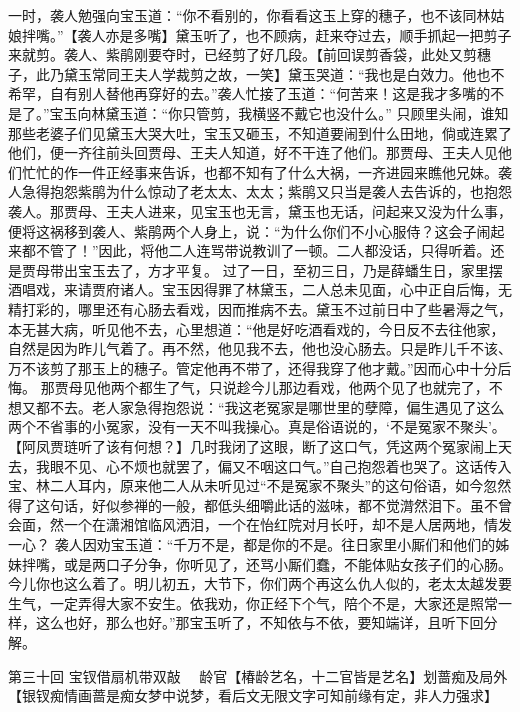 \documentclass[12pt,oneside]{book}
\begin{document}
一时，袭人勉强向宝玉道：“你不看别的，你看看这玉上穿的穗子，也不该同林姑娘拌嘴。”【袭人亦是多嘴】黛玉听了，也不顾病，赶来夺过去，顺手抓起一把剪子来就剪。袭人、紫鹃刚要夺时，已经剪了好几段。【前回误剪香袋，此处又剪穗子，此乃黛玉常同王夫人学裁剪之故，一笑】黛玉哭道：“我也是白效力。他也不希罕，自有别人替他再穿好的去。”袭人忙接了玉道：“何苦来！这是我才多嘴的不是了。”宝玉向林黛玉道：“你只管剪，我横竖不戴它也没什么。”
只顾里头闹，谁知那些老婆子们见黛玉大哭大吐，宝玉又砸玉，不知道要闹到什么田地，倘或连累了他们，便一齐往前头回贾母、王夫人知道，好不干连了他们。那贾母、王夫人见他们忙忙的作一件正经事来告诉，也都不知有了什么大祸，一齐进园来瞧他兄妹。袭人急得抱怨紫鹃为什么惊动了老太太、太太；紫鹃又只当是袭人去告诉的，也抱怨袭人。那贾母、王夫人进来，见宝玉也无言，黛玉也无话，问起来又没为什么事，便将这祸移到袭人、紫鹃两个人身上，说：“为什么你们不小心服侍？这会子闹起来都不管了！”因此，将他二人连骂带说教训了一顿。二人都没话，只得听着。还是贾母带出宝玉去了，方才平复。
过了一日，至初三日，乃是薛蟠生日，家里摆酒唱戏，来请贾府诸人。宝玉因得罪了林黛玉，二人总未见面，心中正自后悔，无精打彩的，哪里还有心肠去看戏，因而推病不去。黛玉不过前日中了些暑溽之气，本无甚大病，听见他不去，心里想道：“他是好吃酒看戏的，今日反不去往他家，自然是因为昨儿气着了。再不然，他见我不去，他也没心肠去。只是昨儿千不该、万不该剪了那玉上的穗子。管定他再不带了，还得我穿了他才戴。”因而心中十分后悔。
那贾母见他两个都生了气，只说趁今儿那边看戏，他两个见了也就完了，不想又都不去。老人家急得抱怨说：“我这老冤家是哪世里的孽障，偏生遇见了这么两个不省事的小冤家，没有一天不叫我操心。真是俗语说的，‘不是冤家不聚头’。【阿凤贾琏听了该有何想？】几时我闭了这眼，断了这口气，凭这两个冤家闹上天去，我眼不见、心不烦也就罢了，偏又不咽这口气。”自己抱怨着也哭了。这话传入宝、林二人耳内，原来他二人从未听见过“不是冤家不聚头”的这句俗语，如今忽然得了这句话，好似参禅的一般，都低头细嚼此话的滋味，都不觉潸然泪下。虽不曾会面，然一个在潇湘馆临风洒泪，一个在怡红院对月长吁，却不是人居两地，情发一心？
袭人因劝宝玉道：“千万不是，都是你的不是。往日家里小厮们和他们的姊妹拌嘴，或是两口子分争，你听见了，还骂小厮们蠢，不能体贴女孩子们的心肠。今儿你也这么着了。明儿初五，大节下，你们两个再这么仇人似的，老太太越发要生气，一定弄得大家不安生。依我劝，你正经下个气，陪个不是，大家还是照常一样，这么也好，那么也好。”那宝玉听了，不知依与不依，要知端详，且听下回分解。

 
第三十回  宝钗借扇机带双敲　
龄官【椿龄艺名，十二官皆是艺名】划蔷痴及局外
 【银钗痴情画蔷是痴女梦中说梦，看后文无限文字可知前缘有定，非人力强求】
\end{document}
